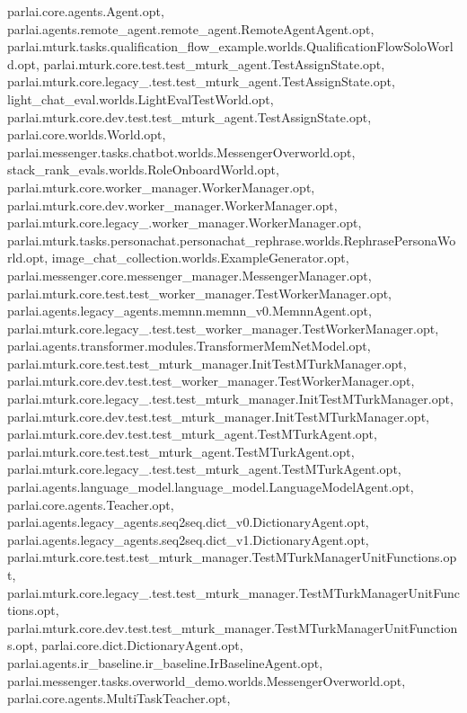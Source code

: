 parlai.\+core.\+agents.\+Agent.\+opt, parlai.\+agents.\+remote\+\_\+agent.\+remote\+\_\+agent.\+Remote\+Agent\+Agent.\+opt, parlai.\+mturk.\+tasks.\+qualification\+\_\+flow\+\_\+example.\+worlds.\+Qualification\+Flow\+Solo\+World.\+opt, parlai.\+mturk.\+core.\+test.\+test\+\_\+mturk\+\_\+agent.\+Test\+Assign\+State.\+opt, parlai.\+mturk.\+core.\+legacy\+\_.\+test.\+test\+\_\+mturk\+\_\+agent.\+Test\+Assign\+State.\+opt, light\+\_\+chat\+\_\+eval.\+worlds.\+Light\+Eval\+Test\+World.\+opt, parlai.\+mturk.\+core.\+dev.\+test.\+test\+\_\+mturk\+\_\+agent.\+Test\+Assign\+State.\+opt, parlai.\+core.\+worlds.\+World.\+opt, parlai.\+messenger.\+tasks.\+chatbot.\+worlds.\+Messenger\+Overworld.\+opt, stack\+\_\+rank\+\_\+evals.\+worlds.\+Role\+Onboard\+World.\+opt, parlai.\+mturk.\+core.\+worker\+\_\+manager.\+Worker\+Manager.\+opt, parlai.\+mturk.\+core.\+dev.\+worker\+\_\+manager.\+Worker\+Manager.\+opt, parlai.\+mturk.\+core.\+legacy\+\_.\+worker\+\_\+manager.\+Worker\+Manager.\+opt, parlai.\+mturk.\+tasks.\+personachat.\+personachat\+\_\+rephrase.\+worlds.\+Rephrase\+Persona\+World.\+opt, image\+\_\+chat\+\_\+collection.\+worlds.\+Example\+Generator.\+opt, parlai.\+messenger.\+core.\+messenger\+\_\+manager.\+Messenger\+Manager.\+opt, parlai.\+mturk.\+core.\+test.\+test\+\_\+worker\+\_\+manager.\+Test\+Worker\+Manager.\+opt, parlai.\+agents.\+legacy\+\_\+agents.\+memnn.\+memnn\+\_\+v0.\+Memnn\+Agent.\+opt, parlai.\+mturk.\+core.\+legacy\+\_.\+test.\+test\+\_\+worker\+\_\+manager.\+Test\+Worker\+Manager.\+opt, parlai.\+agents.\+transformer.\+modules.\+Transformer\+Mem\+Net\+Model.\+opt, parlai.\+mturk.\+core.\+test.\+test\+\_\+mturk\+\_\+manager.\+Init\+Test\+M\+Turk\+Manager.\+opt, parlai.\+mturk.\+core.\+dev.\+test.\+test\+\_\+worker\+\_\+manager.\+Test\+Worker\+Manager.\+opt, parlai.\+mturk.\+core.\+legacy\+\_.\+test.\+test\+\_\+mturk\+\_\+manager.\+Init\+Test\+M\+Turk\+Manager.\+opt, parlai.\+mturk.\+core.\+dev.\+test.\+test\+\_\+mturk\+\_\+manager.\+Init\+Test\+M\+Turk\+Manager.\+opt, parlai.\+mturk.\+core.\+dev.\+test.\+test\+\_\+mturk\+\_\+agent.\+Test\+M\+Turk\+Agent.\+opt, parlai.\+mturk.\+core.\+test.\+test\+\_\+mturk\+\_\+agent.\+Test\+M\+Turk\+Agent.\+opt, parlai.\+mturk.\+core.\+legacy\+\_.\+test.\+test\+\_\+mturk\+\_\+agent.\+Test\+M\+Turk\+Agent.\+opt, parlai.\+agents.\+language\+\_\+model.\+language\+\_\+model.\+Language\+Model\+Agent.\+opt, parlai.\+core.\+agents.\+Teacher.\+opt, parlai.\+agents.\+legacy\+\_\+agents.\+seq2seq.\+dict\+\_\+v0.\+Dictionary\+Agent.\+opt, parlai.\+agents.\+legacy\+\_\+agents.\+seq2seq.\+dict\+\_\+v1.\+Dictionary\+Agent.\+opt, parlai.\+mturk.\+core.\+test.\+test\+\_\+mturk\+\_\+manager.\+Test\+M\+Turk\+Manager\+Unit\+Functions.\+opt, parlai.\+mturk.\+core.\+legacy\+\_.\+test.\+test\+\_\+mturk\+\_\+manager.\+Test\+M\+Turk\+Manager\+Unit\+Functions.\+opt, parlai.\+mturk.\+core.\+dev.\+test.\+test\+\_\+mturk\+\_\+manager.\+Test\+M\+Turk\+Manager\+Unit\+Functions.\+opt, parlai.\+core.\+dict.\+Dictionary\+Agent.\+opt, parlai.\+agents.\+ir\+\_\+baseline.\+ir\+\_\+baseline.\+Ir\+Baseline\+Agent.\+opt, parlai.\+messenger.\+tasks.\+overworld\+\_\+demo.\+worlds.\+Messenger\+Overworld.\+opt, parlai.\+core.\+agents.\+Multi\+Task\+Teacher.\+opt, 